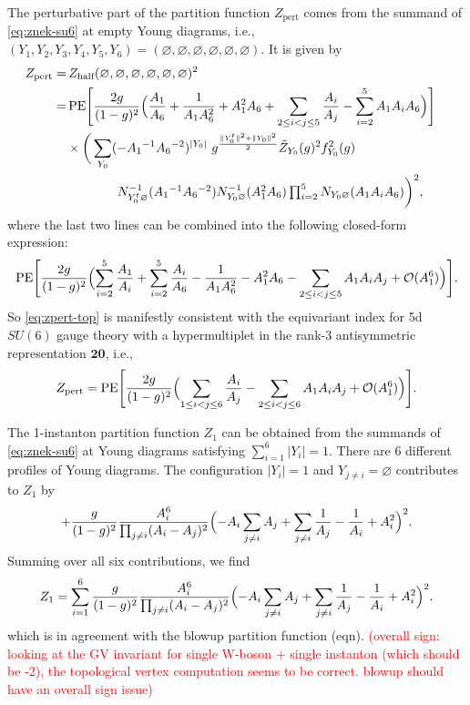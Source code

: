 \documentclass[letterpaper, 11pt]{article}
\begin{document}
The perturbative part of the partition function $Z_{\text{pert}}$ comes from the summand of \eqref{eq:znek-su6} at empty Young diagrams, i.e., $(Y_1, Y_2, Y_3, Y_4, Y_5, Y_6) = (\varnothing,\varnothing,\varnothing,\varnothing,\varnothing,\varnothing)$. It is given by
\begin{align}
  \label{eq:zpert-top}
Z_{\rm pert} 
=& \,
Z_{\text{half}}(\varnothing,\varnothing,\varnothing,\varnothing,\varnothing,\varnothing)^2
\cr
=&\, 
\text{PE} \Biggl[ 
\frac{2g}{(1-g)^2} 
\Bigl( \frac{A_1}{A_6} + \frac{1}{A_1A_6^2} + A_1^2  A_6 
+ \sum_{2 \le i <  j \le 5} \frac{A_i}{A_j}
- \sum_{i=2}^5 A_1 A_i  A_6
\Bigr)
\Biggr]
\cr 
& 
\times \bigg(\sum_{Y_0} ( - A_1{}^{-1} A_6{}^{-2})^{|Y_0|} \ 
g^{\frac{\Vert Y_0^t \Vert ^2+\Vert Y_0\Vert ^2}{2}} \tilde{Z}_{Y_0}(g)^2 f_{Y_0}^2(g)
\cr 
& \qquad \qquad
\textstyle N_{Y_0^t \varnothing }^{-1} (A_1{}^{-1} A_6{}^{-2})
 N^{-1}_{Y_0 \varnothing } (A_1^2  A_6)\prod_{i=2}^5 N_{Y_0 \varnothing } (A_1 A_i  A_6)\bigg)^2 ,
\end{align}
where the last two lines can be  combined into the following closed-form expression:
\begin{align}
  \text{PE} \Biggl[ 
    \frac{2g}{(1-g)^2} 
    \Bigl(\sum_{i=2}^5  \frac{A_1}{A_i} +\sum_{i=2}^5  \frac{A_i}{A_6} - \frac{1}{A_1A_6^2} - A_1^2  A_6 
    - \sum_{2\leq i<j \leq 5} A_1 A_i  A_j + \mathcal{O}(A_1^6)
    \Bigr)
    \Biggr].
\end{align}
So \eqref{eq:zpert-top} is manifestly consistent with the equivariant index  \cite{Shadchin:2005mx} for 5d $SU(6)$ gauge theory with a hypermultiplet in the rank-3 antisymmetric representation $\mathbf{20}$, i.e., 
\begin{align}
  Z_{\rm pert}  = \text{PE} \Biggl[ 
    \frac{2g}{(1-g)^2} 
    \Bigl(\sum_{1\leq i<j \leq 6}  \frac{A_i}{A_j} 
    - \sum_{2\leq i<j \leq 6} A_1 A_i  A_j + \mathcal{O}(A_1^6)
    \Bigr)
    \Biggr].
\end{align}

The 1-instanton partition function $Z_1$ can be obtained from the summands of \eqref{eq:znek-su6} at Young diagrams satisfying $\sum_{i=1}^6 |Y_i|=1$. There are 6 different profiles of Young diagrams. The configuration $|Y_i| = 1$ and $Y_{j\neq i} = \varnothing$ contributes to $Z_{1}$ by
\begin{align}
  + \frac{g}{(1-g)^2} \frac{A_i^6}{\prod_{j \neq i} (A_i - A_j)^2} 
  \Bigl(-A_i \sum_{j\neq i} A_j +  \sum_{j\neq i}\frac{1}{A_j}  - \frac{1}{A_i} + A_i^2
 \Bigr)^2. 
\end{align}
Summing over all six contributions, we find
\begin{align}
  Z_1 = \sum_{i=1}^6 \frac{g}{(1-g)^2} \frac{A_i^6}{\prod_{j \neq i} (A_i - A_j)^2} 
  \Bigl(-A_i \sum_{j\neq i} A_j +  \sum_{j\neq i}\frac{1}{A_j}  - \frac{1}{A_i} + A_i^2
 \Bigr)^2. 
\end{align}
which is in agreement with the blowup partition function (eqn). \textcolor{red}{(overall sign: looking at the GV invariant for single W-boson + single instanton (which should be -2), the topological vertex computation seems to be correct. blowup should have an overall sign issue)}
\pagebreak
\end{document}
